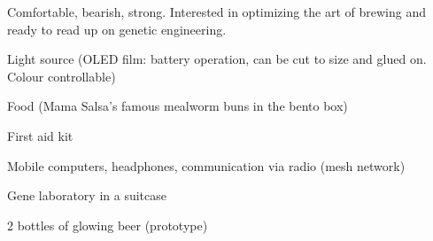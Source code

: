 \newpage
\begin{npcBox}[title=The Barrel continued]
    \begin{npcDescription}
    Comfortable, bearish, strong. Interested in optimizing the art of brewing and ready to read up on genetic engineering.
    \end{npcDescription}


    \begin{equipment}
    \item Light source (OLED film: battery operation, can be cut to size and glued on. Colour controllable)
    \item Food (Mama Salsa's famous mealworm buns in the bento box)
    \item First aid kit
    \item Mobile computers, headphones, communication via radio (mesh network)
    \item Gene laboratory in a suitcase
    \item 2 bottles of glowing beer (prototype)
    \end{equipment}
\end{npcBox}



